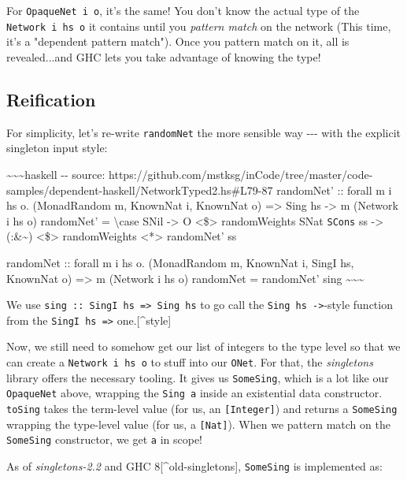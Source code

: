 \documentclass[]{article}
\begin{document}
For \texttt{OpaqueNet\ i\ o}, it's the same! You don't know the actual type of
the \texttt{Network\ i\ hs\ o} it contains until you \emph{pattern match} on the
network (This time, it's a "dependent pattern match"). Once you pattern match on
it, all is revealed...and GHC lets you take advantage of knowing the type!

\subsection{Reification}

For simplicity, let's re-write \texttt{randomNet} the more sensible way -\/-\/-
with the explicit singleton input style:

\textasciitilde{}\textasciitilde{}\textasciitilde{}haskell -\/- source:
https://github.com/mstksg/inCode/tree/master/code-samples/dependent-haskell/NetworkTyped2.hs\#L79-87
randomNet' :: forall m i hs o. (MonadRandom m, KnownNat i, KnownNat o)
=\textgreater{} Sing hs -\textgreater{} m (Network i hs o) randomNet' =
\textbackslash{}case SNil -\textgreater{} O \textless{}\$\textgreater{}
randomWeights SNat \texttt{SCons} ss -\textgreater{} (:\&\textasciitilde{})
\textless{}\$\textgreater{} randomWeights \textless{}*\textgreater{} randomNet'
ss

randomNet :: forall m i hs o. (MonadRandom m, KnownNat i, SingI hs, KnownNat o)
=\textgreater{} m (Network i hs o) randomNet = randomNet' sing
\textasciitilde{}\textasciitilde{}\textasciitilde{}

We use \texttt{sing\ ::\ SingI\ hs\ =\textgreater{}\ Sing\ hs} to go call the
\texttt{Sing\ hs\ -\textgreater{}}-style function from the
\texttt{SingI\ hs\ =\textgreater{}} one.{[}\^{}style{]}

Now, we still need to somehow get our list of integers to the type level so that
we can create a \texttt{Network\ i\ hs\ o} to stuff into our \texttt{ONet}. For
that, the \emph{singletons} library offers the necessary tooling. It gives us
\texttt{SomeSing}, which is a lot like our \texttt{OpaqueNet} above, wrapping
the \texttt{Sing\ a} inside an existential data constructor. \texttt{toSing}
takes the term-level value (for us, an \texttt{{[}Integer{]}}) and returns a
\texttt{SomeSing} wrapping the type-level value (for us, a \texttt{{[}Nat{]}}).
When we pattern match on the \texttt{SomeSing} constructor, we get \texttt{a} in
scope!

As of \emph{singletons-2.2} and GHC 8{[}\^{}old-singletons{]}, \texttt{SomeSing}
is implemented as:
\end{document}
